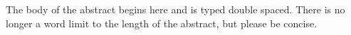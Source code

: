 \begin{buabstract}
The body of the abstract begins here and is typed double spaced. There is
no longer a word limit to the length of the abstract, but please be concise.
\end{buabstract}

